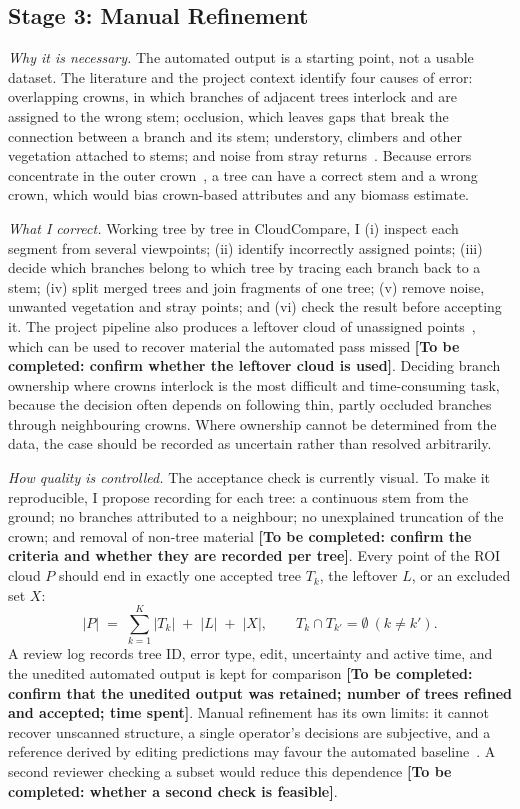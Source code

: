 \documentclass[runningheads]{llncs}
\newcommand{\todo}[1]{\textbf{[To be completed: #1]}}
\begin{document}
\subsection{Stage 3: Manual Refinement}\label{sec:manual}
\emph{Why it is necessary.} The automated output is a starting point, not a usable dataset. The literature and the project context identify four causes of error: overlapping crowns, in which branches of adjacent trees interlock and are assigned to the wrong stem; occlusion, which leaves gaps that break the connection between a branch and its stem; understory, climbers and other vegetation attached to stems; and noise from stray returns~\cite{calders2020,cherlet2026,cushman2026,meetingnotes}. Because errors concentrate in the outer crown~\cite{cherlet2026}, a tree can have a correct stem and a wrong crown, which would bias crown-based attributes and any biomass estimate.

\emph{What I correct.} Working tree by tree in CloudCompare, I (i) inspect each segment from several viewpoints; (ii) identify incorrectly assigned points; (iii) decide which branches belong to which tree by tracing each branch back to a stem; (iv) split merged trees and join fragments of one tree; (v) remove noise, unwanted vegetation and stray points; and (vi) check the result before accepting it. The project pipeline also produces a leftover cloud of unassigned points~\cite{pipeline}, which can be used to recover material the automated pass missed \todo{confirm whether the leftover cloud is used}. Deciding branch ownership where crowns interlock is the most difficult and time-consuming task, because the decision often depends on following thin, partly occluded branches through neighbouring crowns. Where ownership cannot be determined from the data, the case should be recorded as uncertain rather than resolved arbitrarily.

\emph{How quality is controlled.} The acceptance check is currently visual. To make it reproducible, I propose recording for each tree: a continuous stem from the ground; no branches attributed to a neighbour; no unexplained truncation of the crown; and removal of non-tree material \todo{confirm the criteria and whether they are recorded per tree}. Every point of the ROI cloud $P$ should end in exactly one accepted tree $T_k$, the leftover $L$, or an excluded set $X$:
\begin{equation}
|P| \;=\; \sum_{k=1}^{K}|T_k| \;+\; |L| \;+\; |X|, \qquad T_k\cap T_{k'}=\emptyset\ (k\neq k').
\end{equation}
A review log records tree ID, error type, edit, uncertainty and active time, and the unedited automated output is kept for comparison \todo{confirm that the unedited output was retained; number of trees refined and accepted; time spent}. Manual refinement has its own limits: it cannot recover unscanned structure, a single operator's decisions are subjective, and a reference derived by editing predictions may favour the automated baseline~\cite{cherlet2026}. A second reviewer checking a subset would reduce this dependence \todo{whether a second check is feasible}.
\end{document}
